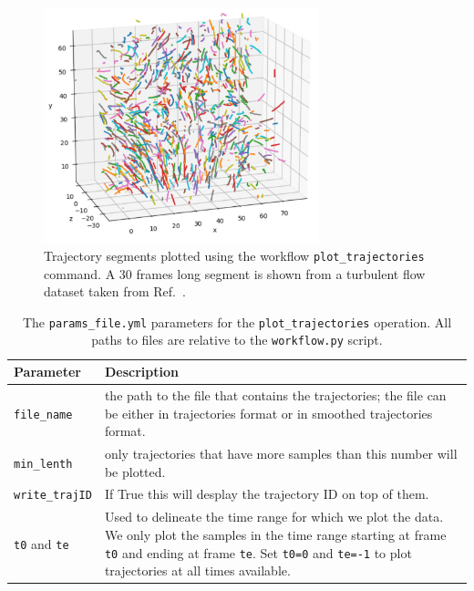 \documentclass[10pt,a4paper]{article}
\begin{document}
\begin{figure}
	\centering
	\includegraphics[width=8cm]{trajectory_plot.pdf}
	\caption{Trajectory segments plotted using the workflow \texttt{plot\_trajectories} command. A 30 frames long segment is shown from a turbulent flow dataset taken from Ref.~\cite{Shnapp2023}. \label{fig:trajectory_plot}}
\end{figure}


%
\begin{table}[!ht]
	\centering
	\caption{The \texttt{params\_file.yml} parameters for the \texttt{plot\_trajectories} operation. All paths to files are relative to the \texttt{workflow.py} script. \label{tab:plotting_parameter}}
	\begin{tabular}{l m{12cm}}
		\hline
		Parameter & Description\\[.2cm]
		\hline
		\texttt{file\_name} & the path to the file that contains the trajectories; the file can be either in trajectories format or in smoothed trajectories format. \\[.2cm]
		\texttt{min\_lenth} & only trajectories that have more samples than this number will be plotted.\\[.2cm]
		\texttt{write\_trajID} & If True this will desplay the trajectory ID on top of them.\\[.2cm]
		\texttt{t0} and \texttt{te} & Used to delineate the time range for which we plot the data. We only plot the samples in the time range starting at frame \texttt{t0} and ending at frame \texttt{te}. Set \texttt{t0=0} and \texttt{te=-1} to plot trajectories at all times available. \\[.2cm]
		\hline
	\end{tabular}
\end{table}
\end{document}
